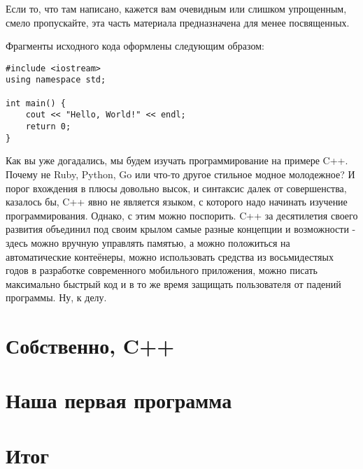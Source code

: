 \documentclass{article}
\begin{document}

Если то, что там написано, кажется вам очевидным или слишком упрощенным, смело пропускайте, эта часть материала предназначена для менее посвященных.

Фрагменты исходного кода оформлены следующим образом:

\begin{lstlisting}[caption={Пример оформления кода}, captionpos=b, style=cpp]
#include <iostream>
using namespace std;

int main() {
	cout << "Hello, World!" << endl;
	return 0;
}
\end{lstlisting}

Как вы уже догадались, мы будем изучать программирование на примере C++. Почему не Ruby, Python, Go или что-то другое стильное модное молодежное? И порог вхождения в плюсы довольно высок, и синтаксис далек от совершенства, казалось бы, C++ явно не является языком, с которого надо начинать изучение программирования. Однако, с этим можно поспорить. C++ за десятилетия своего развития объединил под своим крылом самые разные концепции и возможности - здесь можно вручную управлять памятью, а можно положиться на автоматические контеёнеры, можно использовать средства из восьмидестяых годов в разработке современного мобильного приложения, можно писать максимально быстрый код и в то же время защищать пользователя от падений программы. Ну, к делу.

\section{Собственно, C++}

\section{Наша первая программа}

\section{Итог}
\end{document}
